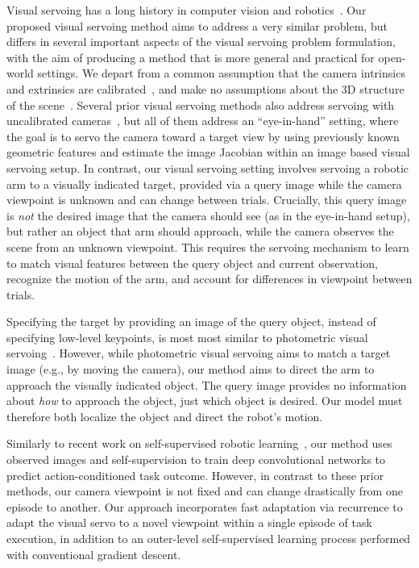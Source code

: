 \documentclass[10pt,twocolumn,letterpaper]{article}
\begin{document}
Visual servoing has a long history in computer vision and robotics~\cite{chaumette2006visual, hutchinson1996tutorial}. Our proposed visual servoing method aims to address a very similar problem, but differs in several important aspects of the visual servoing problem formulation, with the aim of producing a method that is more general and practical for open-world settings.
We depart from a common assumption that the camera intrinsics and extrinsics are calibrated~\cite{mohta2014vision,espiau1992new}, and make no assumptions about the 3D structure of the scene~\cite{espiau1992new, mohta2014vision,collewet2008visual}. Several prior visual servoing methods also address servoing with uncalibrated cameras~\cite{yoshimi1994active, jagersand1997experimental,massoud2007global}, but all of them address an ``eye-in-hand'' setting, where the goal is to servo the camera toward a target view by using previously known geometric features and estimate the image Jacobian within an image based visual servoing setup. In contrast, our visual servoing setting involves servoing a robotic arm to a visually indicated target, provided via a query image while the camera viewpoint is unknown and can change between trials. Crucially, this query image is \emph{not} the desired image that the camera should see (as in the eye-in-hand setup), but rather an object that arm should approach, while the camera observes the scene from an unknown  viewpoint. This requires the servoing mechanism to learn to match visual features between the query object and current observation, recognize the motion of the arm, and account for differences in viewpoint between trials.

Specifying the target by providing an image of the query object, instead of specifying low-level keypoints, is most most similar to photometric visual servoing~\cite{caron2013photometric}. However, while photometric visual servoing aims to match a target image (e.g., by moving the camera), our method aims to direct the arm to approach the visually indicated object. The query image provides no information about \emph{how} to approach the object, just which object is desired. Our model must therefore both localize the object and direct the robot's motion.

Similarly to recent work on self-supervised robotic learning~\cite{levine2016end,levine2016learning,agrawal2016learning,gandhi2017learning,pinto2016supersizing}, our method uses observed images and self-supervision to train deep convolutional networks to predict action-conditioned task outcome. However, in contrast to these prior methods, our camera viewpoint is not fixed and can change drastically from one episode to another. Our approach incorporates fast adaptation via recurrence to adapt the visual servo to a novel viewpoint within a single episode of task execution, in addition to an outer-level self-supervised learning process performed with conventional gradient descent.
\end{document}
